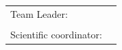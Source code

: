 \pagestyle{fancy}
\setlength{\voffset}{-10pt}
\setlength\headheight{70.0pt}
\renewcommand{\headrulewidth}{0pt}
\cfoot{}
\lfoot{}
\rfoot{}
\begin{center}
	{\department}

	\vspace{4cm}
	\makeThesisTitle %
	~\\~\\

	\makeThesisType

	~\\\vspace{6.5cm}

	\begin{tabular}{p{.3\linewidth}p{.5\linewidth}}
		{\hfill Team Leader:} & {\bf \thesisauthor} \\
		&\\
		{\parbox[t]{\linewidth}{\hfill Scientific coordinator:}}& {\bf \thesissupervisor}\\
	\end{tabular}

	\vspace{3cm}
	{\bf \thesisyear}
\end{center}
